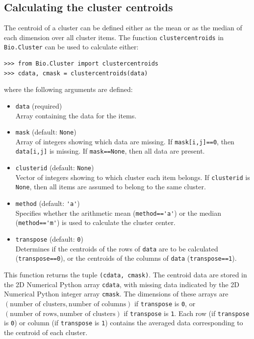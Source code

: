 \documentclass{report}
\begin{document}
\subsection*{Calculating the cluster centroids}
\label{subsec:clustercentroids}

The centroid of a cluster can be defined either as the mean or as the median of each dimension over all cluster items. The function \verb|clustercentroids| in \verb|Bio.Cluster| can be used to calculate either:

\begin{verbatim}
>>> from Bio.Cluster import clustercentroids
>>> cdata, cmask = clustercentroids(data)
\end{verbatim}
where the following arguments are defined:
\begin{itemize}
\item \verb|data| (required) \\
Array containing the data for the items.
\item \verb|mask| (default: \verb|None|) \\
Array of integers showing which data are missing. If \verb|mask[i,j]==0|, then \verb|data[i,j]| is missing. If \verb|mask==None|, then all data are present.
\item \verb|clusterid| (default: \verb|None|) \\
Vector of integers showing to which cluster each item belongs. If \verb|clusterid| is \verb|None|, then all items are assumed to belong to the same cluster.
\item \verb|method| (default: \verb|'a'|) \\
Specifies whether the arithmetic mean (\verb|method=='a'|) or the median (\verb|method=='m'|) is used to calculate the cluster center.
\item \verb|transpose| (default: \verb|0|) \\
Determines if the centroids of the rows of \verb|data| are to be calculated (\verb|transpose==0|), or the centroids of the columns of \verb|data| (\verb|transpose==1|).
\end{itemize}

This function returns the tuple \verb|(cdata, cmask)|. The centroid data are stored in the 2D Numerical Python array \verb|cdata|, with missing data indicated by the 2D Numerical Python integer array \verb|cmask|.  The dimensions of these arrays are $\left(\textrm{number of clusters}, \textrm{number of columns}\right)$ if \verb|transpose| is \verb|0|, or $\left(\textrm{number of rows}, \textrm{number of clusters}\right)$ if \verb|transpose| is \verb|1|. Each row (if \verb|transpose| is \verb|0|) or column (if \verb|transpose| is \verb|1|) contains the averaged data corresponding to the centroid of each cluster.
\end{document}
